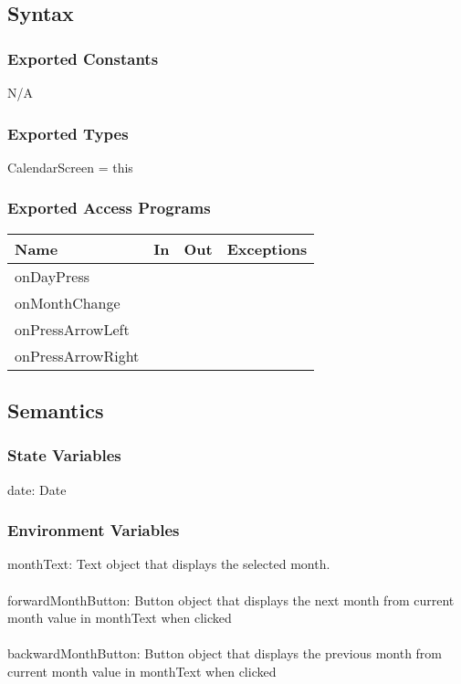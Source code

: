 \documentclass[12pt, titlepage]{article}
\begin{document}
\subsection{Syntax}

\subsubsection{Exported Constants}
N/A

\subsubsection{Exported Types}
CalendarScreen = this

\subsubsection{Exported Access Programs}

\begin{tabular}{| l | l | l | l |}
	\hline
	{\textbf{Name}} & {\textbf{In}} & {\textbf{Out}} & {\textbf{Exceptions}}\\
	\hline
	{onDayPress} & & & \\
	\hline
	{onMonthChange} & & & \\
	\hline
	{onPressArrowLeft} & & & \\
	\hline
	{onPressArrowRight} & & & \\
	\hline
\end{tabular}

\subsection{Semantics}

\subsubsection{State Variables}
date: Date

\subsubsection{Environment Variables}

monthText: Text object that displays the selected month.\\\\
forwardMonthButton: Button object that displays the next month from current month value in monthText when clicked\\\\
backwardMonthButton: Button object that displays the previous month from current month value in monthText when clicked
\end{document}
